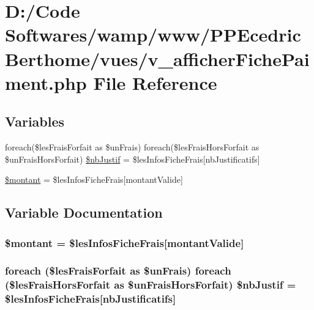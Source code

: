 \hypertarget{v__afficher_fiche_paiment_8php}{}\section{D\+:/\+Code Softwares/wamp/www/\+P\+P\+Ecedric\+Berthome/vues/v\+\_\+afficher\+Fiche\+Paiment.php File Reference}
\label{v__afficher_fiche_paiment_8php}
\subsection*{Variables}
\begin{DoxyCompactItemize}
\item 
foreach(\$les\+Frais\+Forfait as \$un\+Frais) foreach(\$les\+Frais\+Hors\+Forfait as \$un\+Frais\+Hors\+Forfait) \hyperlink{v__afficher_fiche_paiment_8php_a61cafff25843b416c271d6a49d782de7}{\$nb\+Justif} = \$les\+Infos\+Fiche\+Frais\mbox{[}\textquotesingle{}nb\+Justificatifs\textquotesingle{}\mbox{]}
\item 
\hyperlink{v__afficher_fiche_paiment_8php_a68eb0a4a32f374b4548256f8a63eb191}{\$montant} = \$les\+Infos\+Fiche\+Frais\mbox{[}\textquotesingle{}montant\+Valide\textquotesingle{}\mbox{]}
\end{DoxyCompactItemize}


\subsection{Variable Documentation}
\subsubsection[{\texorpdfstring{\$montant}{$montant}}]{\setlength{\rightskip}{0pt plus 5cm}\$montant = \$les\+Infos\+Fiche\+Frais\mbox{[}\textquotesingle{}montant\+Valide\textquotesingle{}\mbox{]}}\hypertarget{v__afficher_fiche_paiment_8php_a68eb0a4a32f374b4548256f8a63eb191}{}\label{v__afficher_fiche_paiment_8php_a68eb0a4a32f374b4548256f8a63eb191}
\subsubsection[{\texorpdfstring{\$nb\+Justif}{$nbJustif}}]{\setlength{\rightskip}{0pt plus 5cm}foreach (\$les\+Frais\+Forfait as \$un\+Frais) foreach (\$les\+Frais\+Hors\+Forfait as \$un\+Frais\+Hors\+Forfait) \$nb\+Justif = \$les\+Infos\+Fiche\+Frais\mbox{[}\textquotesingle{}nb\+Justificatifs\textquotesingle{}\mbox{]}}\hypertarget{v__afficher_fiche_paiment_8php_a61cafff25843b416c271d6a49d782de7}{}\label{v__afficher_fiche_paiment_8php_a61cafff25843b416c271d6a49d782de7}
